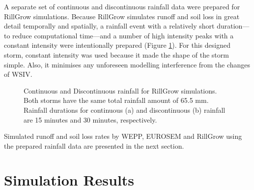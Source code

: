 A separate set of continuous and discontinuous rainfall data were prepared for
RillGrow simulations. Because RillGrow simulates runoff and soil loss in great
detail temporally and spatially, a rainfall event with a relatively short
duration---to reduce computational time---and a number of high intensity peaks
with a constant intensity were intentionally prepared (Figure
\ref{fig:rg2_input_continuous}). For this designed storm, constant intensity was
used because it made the shape of the storm simple. Also, it minimises any
unforeseen modelling interference from the changes of WSIV.

\begin{figure}[tbp]
  \centering
  \caption{Continuous and Discontinuous rainfall for RillGrow simulations. Both
storms have the same total rainfall amount of 65.5 mm. Rainfall durations for
continuous (a) and discontinuous (b) rainfall are 15 minutes and 30 minutes,
respectively.}
  \label{fig:rg2_input_continuous}
\end{figure}

Simulated runoff and soil loss rates by WEPP, EUROSEM and RillGrow using
the prepared rainfall data are presented in the next section.

\section{Simulation Results}
\label{sec:InterStormGapsSimulatedResults}

